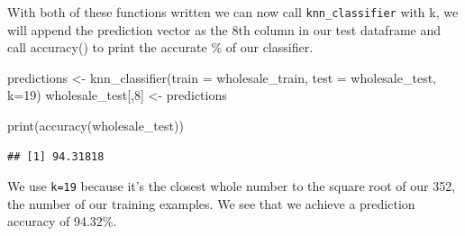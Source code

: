\documentclass[
]{article}
\newenvironment{Shaded}{\begin{snugshade}}{\end{snugshade}}
\newcommand{\AttributeTok}[1]{\textcolor[rgb]{0.77,0.63,0.00}{#1}}
\newcommand{\DecValTok}[1]{\textcolor[rgb]{0.00,0.00,0.81}{#1}}
\newcommand{\FunctionTok}[1]{\textcolor[rgb]{0.00,0.00,0.00}{#1}}
\newcommand{\NormalTok}[1]{#1}
\newcommand{\OtherTok}[1]{\textcolor[rgb]{0.56,0.35,0.01}{#1}}
\newcommand{\SpecialCharTok}[1]{\textcolor[rgb]{0.00,0.00,0.00}{#1}}
\begin{document}
With both of these functions written we can now call
\texttt{knn\_classifier} with k, we will append the prediction vector as
the 8th column in our test dataframe and call accuracy() to print the
accurate \% of our classifier.

\begin{Shaded}
\begin{Highlighting}[]
\NormalTok{predictions }\OtherTok{\textless{}{-}} \FunctionTok{knn\_classifier}\NormalTok{(}\AttributeTok{train =}\NormalTok{ wholesale\_train, }\AttributeTok{test =}\NormalTok{ wholesale\_test, }\AttributeTok{k=}\DecValTok{19}\NormalTok{)}
\NormalTok{wholesale\_test[,}\DecValTok{8}\NormalTok{] }\OtherTok{\textless{}{-}}\NormalTok{ predictions }

\FunctionTok{print}\NormalTok{(}\FunctionTok{accuracy}\NormalTok{(wholesale\_test))}
\end{Highlighting}
\end{Shaded}

\begin{verbatim}
## [1] 94.31818
\end{verbatim}

We use \texttt{k=19} because it's the closest whole number to the square
root of our 352, the number of our training examples. We see that we
achieve a prediction accuracy of 94.32\%.

\begin{Shaded}
\end{Shaded}
\end{document}

